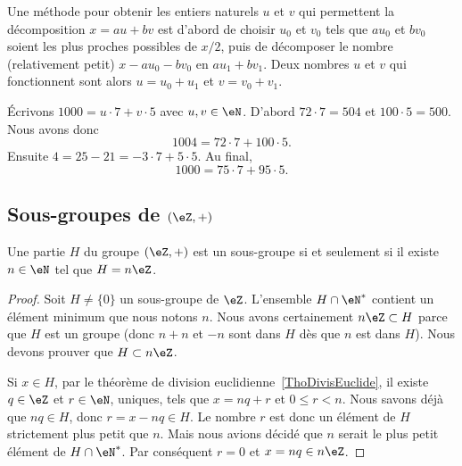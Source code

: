 \begin{normaltext}
    Une méthode pour obtenir les entiers naturels $u$ et $v$ qui permettent la décomposition \(x = au + bv \) est d'abord de choisir $u_0$ et $v_0$ tels que \( au_0 \) et \( bv_0 \) soient les plus proches possibles de $x/2$, puis de décomposer le nombre (relativement petit) \( x - au_0 - bv_0 \) en \( au_1 + bv_1 \). Deux nombres $u$ et $v$ qui fonctionnent sont alors $u = u_0 + u_1$ et $v = v_0 + v_1$.
\end{normaltext}

\begin{example}
    Écrivons \( 1000=u\cdot 7+v\cdot 5\) avec \( u,v\in \eN\). D'abord \( 72\cdot 7=504\) et \( 100\cdot 5=500\). Nous avons donc
    \begin{equation}
        1004=72\cdot 7+100\cdot 5.
    \end{equation}
    Ensuite \( 4=25-21=-3\cdot 7+5\cdot 5\). Au final,
    \begin{equation}
        1000=75\cdot 7+95\cdot 5.
    \end{equation}
\end{example}

\subsection{Sous-groupes de \texorpdfstring{$(\eZ,+)$}{(Z,+)}}

\begin{proposition} \label{PropSsgpZestnZ}
    Une partie \( H\) du groupe \( (\eZ,+)\) est un sous-groupe si et seulement si il existe \( n\in\eN\) tel que \( H=n\eZ\).
\end{proposition}

\begin{proof}
    Soit \( H\neq\{ 0 \}\) un sous-groupe de \( \eZ\). L'ensemble \( H\cap\eN^*\) contient un élément minimum que nous notons \( n\). Nous avons certainement \( n\eZ\subset H\) parce que \( H\) est un groupe (donc \( n+n\) et \( -n\) sont dans \( H\) dès que \( n\) est dans \( H\)). Nous devons prouver que \( H\subset n\eZ\).

    Si \( x\in H\), par le théorème de division euclidienne~\ref{ThoDivisEuclide}, il existe \( q\in\eZ\) et \( r\in\eN \), uniques, tels que \( x=nq+r\) et \(0 \leq r < n \). Nous savons déjà que \( nq\in H\), donc \( r = x - nq \in H \). Le nombre \( r\) est donc un élément de \( H\) strictement plus petit que \( n\). Mais nous avions décidé que \( n\) serait le plus petit élément de \( H\cap\eN^*\). Par conséquent \( r=0\) et \( x=nq\in n\eZ\).
\end{proof}


